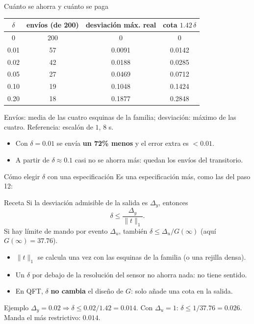 \documentclass[aspectratio=169,11pt]{beamer}
\begin{document}
\begin{frame}{Cuánto se ahorra y cuánto se paga}
  \small
  \begin{center}
  \begin{tabular}{c|c|c|c}
    $\delta$ & envíos (de 200) & desviación máx. real & cota $1.42\,\delta$\\\hline
    0 & 200 & 0 & 0\\
    0.01 & 57 & 0.0091 & 0.0142\\
    0.02 & 42 & 0.0188 & 0.0285\\
    0.05 & 27 & 0.0469 & 0.0712\\
    0.10 & 19 & 0.1048 & 0.1424\\
    0.20 & 18 & 0.1877 & 0.2848
  \end{tabular}
  \end{center}
  \footnotesize
  Envíos: media de las cuatro esquinas de la familia; desviación: máximo de las cuatro. Referencia: escalón de $1$, 8 s.
  \begin{itemize}
    \item Con $\delta=0.01$ se envía \textbf{un 72\% menos} y el error extra es $<0.01$.
    \item A partir de $\delta\approx0.1$ casi no se ahorra más: quedan los envíos del transitorio.
  \end{itemize}
\end{frame}

\begin{frame}{Cómo elegir $\delta$ con una especificación}
  \footnotesize
  Es una especificación más, como las del paso 12:
  \begin{block}{Receta}
    Si la desviación admisible de la salida es $\Delta_y$, entonces
    \[ \delta\le\frac{\Delta_y}{\|t\|_1}. \]
    Si hay límite de mando por evento $\Delta_u$, también $\delta\le\Delta_u/G(\infty)$ (aquí $G(\infty)=37.76$).
  \end{block}
  \begin{itemize}
    \item $\|t\|_1$ se calcula una vez con las esquinas de la familia (o una rejilla densa).
    \item Un $\delta$ por debajo de la resolución del sensor no ahorra nada: no tiene sentido.
    \item En QFT, $\delta$ \textbf{no cambia} el diseño de $G$: solo añade una cota en la salida.
  \end{itemize}
  \begin{exampleblock}{Ejemplo}
    $\Delta_y=0.02\Rightarrow\delta\le0.02/1.42=0.014$. Con $\Delta_u=1$: $\delta\le1/37.76=0.026$. Manda el más restrictivo: $0.014$.
  \end{exampleblock}
\end{frame}
\end{document}
